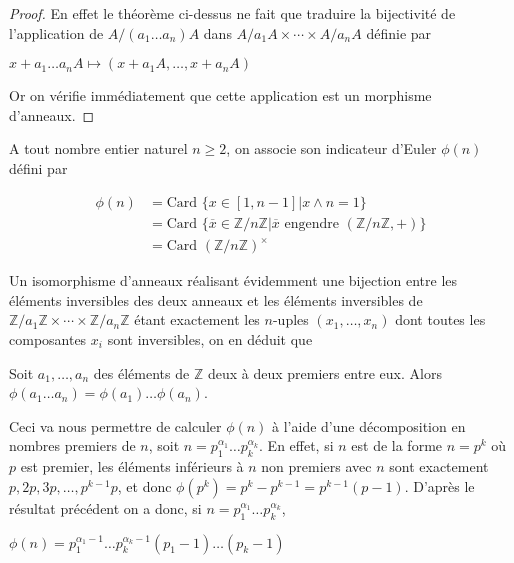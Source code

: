 \begin{proof}
En effet le théorème ci-dessus ne fait que traduire la
bijectivité de l'application de
$A/(a_1 \ldots a_n)A$
dans $A/a_1A \times \cdots \times A/a_nA$
définie par

$x + a_1 \ldots a_n A \mapsto (x + a_1A, \ldots, x + a_nA)$

Or on vérifie immédiatement que cette application est un morphisme
d'anneaux.
\end{proof}

\begin{de}
A tout nombre entier naturel $n \geq 2$, on associe son
indicateur d'Euler $\phi(n)$ défini par

\begin{align*}
\phi(n) &= \text{Card }\{x \in [1,n - 1] | x \wedge n = 1\} \\
&= \text{Card }\{\overline{x} \in \mathbb{Z}/n\mathbb{Z} | \overline{x} \text{ engendre } (\mathbb{Z}/n\mathbb{Z},+)\} \\
&= \text{Card }(\mathbb{Z}/n\mathbb{Z})^\times
\end{align*}
\end{de}

Un isomorphisme d'anneaux réalisant évidemment une bijection entre les
éléments inversibles des deux anneaux et les éléments inversibles de
$\mathbb{Z}/a_1\mathbb{Z} \times \cdots \times \mathbb{Z}/a_n\mathbb{Z}$ étant
exactement les $n$-uples
$(x_1, \ldots, x_n)$
dont toutes les composantes $x_i$ sont inversibles, on en déduit
que

\begin{thm}
Soit
$a_1, \ldots, a_n$
des éléments de $\mathbb{Z}$ deux à deux premiers entre eux. Alors
$\phi(a_1 \ldots a_n) = \phi(a_1) \ldots \phi(a_n)$.
\end{thm}

\begin{rem}
Ceci va nous permettre de calculer $\phi(n)$ à l'aide d'une
décomposition en nombres premiers de $n$, soit $n = p_1^{\alpha_1} \ldots p_k^{\alpha_k}$.
En effet, si $n$ est de la forme $n = p^k$ où $p$ est premier, les
éléments inférieurs à $n$ non premiers avec $n$ sont exactement
$p,2p,3p,\ldots,p^{k-1}p$,
et donc $\phi(p^k) = p^k - p^{k-1} = p^{k-1}(p - 1)$. D'après le résultat précédent on a donc, si $n = p_1^{\alpha_1} \ldots p_k^{\alpha_k}$,

$\phi(n) = p_1^{\alpha_1-1} \ldots p_k^{\alpha_k-1}(p_1 - 1) \ldots (p_k - 1)$
\end{rem}